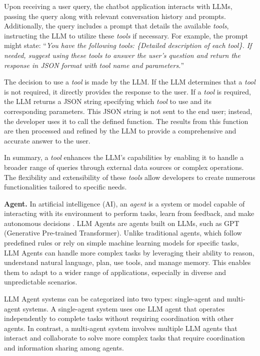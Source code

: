 \documentclass[runningheads]{llncs}
\begin{document}
Upon receiving a user query, the chatbot application interacts with LLMs, passing the query along with relevant conversation history and prompts. Additionally, the query includes a prompt that details the available \textit{tools}, instructing the LLM to utilize these \textit{tools} if necessary. For example, the prompt might state: ``\textit{You have the following tools: \{Detailed description of each tool\}. If needed, suggest using these tools to answer the user's question and return the response in JSON format with {tool name and parameters}.}''

The decision to use a \textit{tool} is made by the LLM. If the LLM determines that a \textit{tool} is not required, it directly provides the response to the user. If a \textit{tool} is required, the LLM returns a JSON string specifying which \textit{tool} to use and its corresponding parameters. This JSON string is not sent to the end user; instead, the developer uses it to call the defined function. The results from this function are then processed and refined by the LLM to provide a comprehensive and accurate answer to the user.

In summary, a \textit{tool} enhances the LLM's capabilities by enabling it to handle a broader range of queries through external data sources or complex operations. The flexibility and extensibility of these \textit{tools} allow developers to create numerous functionalities tailored to specific needs.

\textbf{Agent.}
In artificial intelligence (AI), an \textit{agent} is a system or model capable of interacting with its environment to perform tasks, learn from feedback, and make autonomous decisions \cite{geeksforgeeks_agents_2023}. LLM Agents \cite{10578990} are agents built on LLMs, such as GPT (Generative Pre-trained Transformer). Unlike traditional agents, which follow predefined rules or rely on simple machine learning models for specific tasks, LLM Agents can handle more complex tasks by leveraging their ability to reason, understand natural language, plan, use tools, and manage memory. This enables them to adapt to a wider range of applications, especially in diverse and unpredictable scenarios.

LLM Agent systems can be categorized into two types: single-agent and multi-agent systems. A single-agent system uses one LLM agent that operates independently to complete tasks without requiring coordination with other agents. In contrast, a multi-agent system involves multiple LLM agents that interact and collaborate to solve more complex tasks that require coordination and information sharing among agents.
\end{document}
